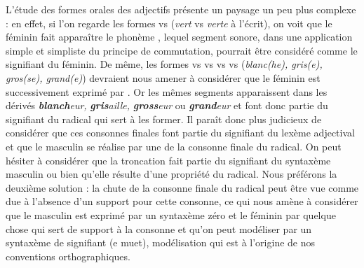 {    L’étude des formes orales des adjectifs présente un paysage un peu plus complexe : en effet, si l’on regarde les formes  vs  (\textit{vert} vs \textit{verte} à l’écrit), on voit que le féminin fait apparaître le phonème , lequel segment sonore, dans une application simple et simpliste du principe de commutation, pourrait être considéré comme le signifiant du féminin. De même, les formes  vs  vs  vs  vs  (\textit{blanc(he), gris(e), gros(se), grand(e)}) devraient nous amener à considérer que le féminin est successivement exprimé par . Or les mêmes segments apparaissent dans les dérivés \textbf{\textit{blanch}}\textit{eur,} \textbf{\textit{gris}}\textit{aille,} \textbf{\textit{gross}}\textit{eur} ou \textbf{\textit{grand}}\textit{eur} et font donc partie du signifiant du radical qui sert à les former. Il paraît donc plus judicieux de considérer que ces consonnes finales font partie du signifiant du lexème adjectival et que le masculin se réalise par une  de la consonne finale du radical. On peut hésiter à considérer que la troncation fait partie du signifiant du syntaxème masculin ou bien qu’elle résulte d’une propriété du radical. Nous préférons la deuxième solution : la chute de la consonne finale du radical peut être vue comme due à l’absence d’un support pour cette consonne, ce qui nous amène à considérer que le masculin est exprimé par un syntaxème zéro et le féminin par quelque chose qui sert de support à la consonne et qu’on peut modéliser par un syntaxème de signifiant   (e muet), modélisation qui est à l’origine de nos conventions orthographiques.

}
